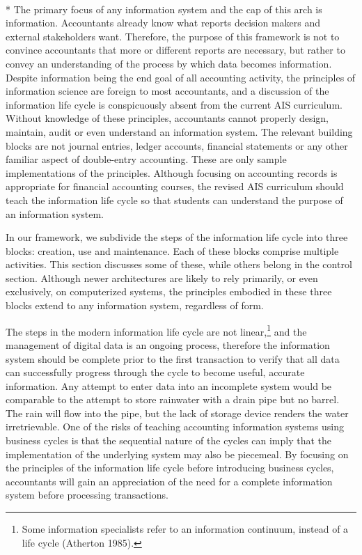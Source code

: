 \documentclass[12pt]{article}
\newcommand{\SubSection}[1]{\vspace{.15in}{\centering{}\normalsize{}\textbf{#1}}\\*\indent{}}
\begin{document}
\SubSection{Information}
The primary focus of any information system and the cap of this arch is information. Accountants already know what reports decision makers and external stakeholders want. Therefore, the purpose of this framework is not to convince accountants that more or different reports are necessary, but rather to convey an understanding of the process by which data becomes information. Despite information being the end goal of all accounting activity, the principles of information science are foreign to most accountants, and a discussion of the information life cycle is conspicuously absent from the current AIS curriculum. Without knowledge of these principles, accountants cannot properly design, maintain, audit or even understand an information system. The relevant building blocks are not journal entries, ledger accounts, financial statements or any other familiar aspect of double-entry accounting. These are only sample implementations of the principles. Although focusing on accounting records is appropriate for financial accounting courses, the revised AIS curriculum should teach the information life cycle so that students can understand the purpose of an information system.

In our framework, we subdivide the steps of the information life cycle into three blocks: creation, use and maintenance. Each of these blocks comprise multiple activities. This section discusses some of these, while others belong in the control section. Although newer architectures are likely to rely primarily, or even exclusively, on computerized systems, the principles embodied in these three blocks extend to any information system, regardless of form.

The steps in the modern information life cycle are not linear,\footnote{Some information specialists refer to an information continuum, instead of a life cycle (Atherton 1985).} and the management of digital data is an ongoing process, therefore the information system should be complete prior to the first transaction to verify that all data can successfully progress through the cycle to become useful, accurate information. Any attempt to enter data into an incomplete system would be comparable to the attempt to store rainwater with a drain pipe but no barrel. The rain will flow into the pipe, but the lack of storage device renders the water irretrievable. One of the risks of teaching accounting information systems using business cycles is that the sequential nature of the cycles can imply that the implementation of the underlying system may also be piecemeal. By focusing on the principles of the information life cycle before introducing business cycles, accountants will gain an appreciation of the need for a complete information system before processing transactions.
\end{document}
